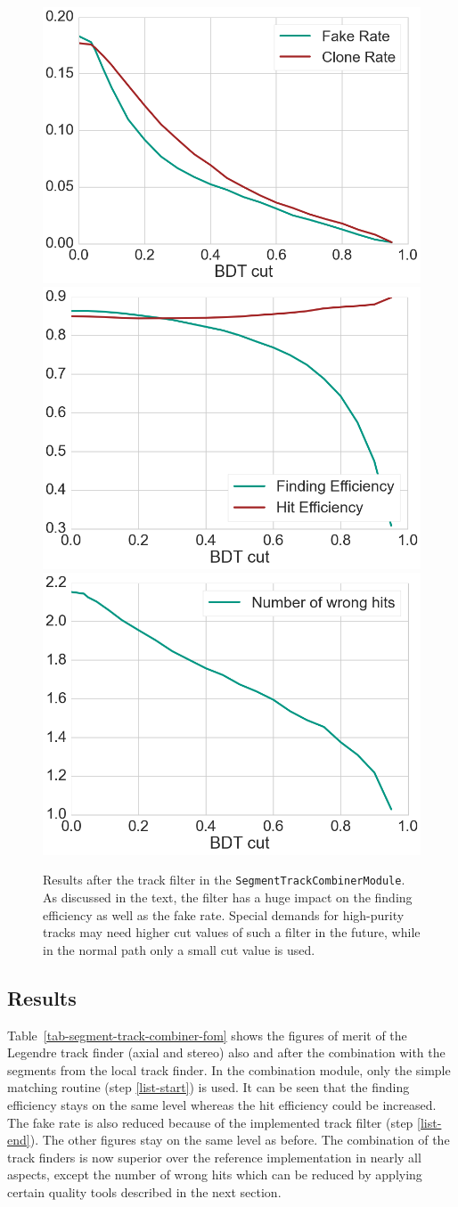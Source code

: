 \begin{figure}
  \centering
  \includegraphics[width=0.48\linewidth]{figures/workflow/track_filter_rate.png}
  \includegraphics[width=0.48\linewidth]{figures/workflow/track_filter_efficiency.png}
  \includegraphics[width=0.48\linewidth]{figures/workflow/track_filter_wrong_hits.png}
  \caption{Results after the track filter in the \texttt{SegmentTrackCombinerModule}. As discussed in the text, the filter has a huge impact on the finding efficiency as well as the fake rate. Special demands for high-purity tracks may need higher cut values of such a filter in the future, while in the normal path only a small cut value is used.}
  \label{fig-track-filter-results}
\end{figure}

\subsection{Results}

Table~\ref{tab-segment-track-combiner-fom} shows the figures of merit of the Legendre track finder (axial and stereo) also and after the combination with the segments from the local track finder. In the combination module, only the simple matching routine (step \ref{list-start}) is used. It can be seen that the finding efficiency stays on the same level whereas the hit efficiency could be increased. The fake rate is also reduced because of the implemented track filter (step \ref{list-end}). The other figures stay on the same level as before. The combination of the track finders is now superior over the reference implementation in nearly all aspects, except the number of wrong hits which can be reduced by applying certain quality tools described in the next section.

